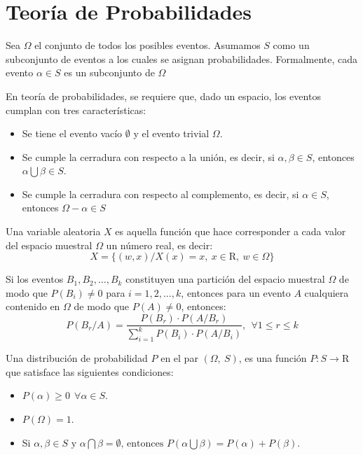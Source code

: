\section{Teoría de Probabilidades}
  \begin{defn} Sea $\Omega$ el conjunto de todos los 
  posibles eventos. Asumamos $S$ como un subconjunto de eventos a los cuales 
  se asignan probabilidades. Formalmente, cada evento $\alpha \in S$ es un 
  subconjunto de $\Omega$
  \end{defn}
 En teoría de probabilidades, se requiere que, dado un espacio, los eventos 
 cumplan con tres características:
  \begin{itemize}
    \item Se tiene el evento vacío $\emptyset$ y el evento trivial $\Omega$.
    \item Se cumple la cerradura con respecto a la unión, es decir, si 
    $\alpha, \beta \in S$, entonces $\alpha \bigcup \beta \in S$.
    \item Se cumple la cerradura con respecto al complemento, es decir, si 
    $\alpha \in S$, entonces $\Omega - \alpha \in S$
  \end{itemize}
  \begin{defn} Una variable aleatoria $X$ es aquella 
  función que hace corresponder a cada valor del espacio muestral $\Omega$ un 
  número real, es decir: 
  $$X = \lbrace (w, x) / X(x) = x, ~x \in \mathrm{R}, ~w \in \Omega \rbrace$$
	\end{defn}
  \begin{thm} Si los eventos $B_1, B_2, \dots, B_k$ 
  constituyen una partición del espacio muestral $\Omega$ de modo que 
  $P(B_i) \neq 0$ para $i = 1,2,\dots,k$, entonces para un evento $A$ 
  cualquiera contenido en $\Omega$ de modo que $P(A) \neq 0$, entonces: 
  $$P(B_r / A) = \dfrac{P(B_r) \cdot P(A / B_r)}{\displaystyle\sum_{i=1}^{k}{P(B_i) \cdot P(A / B_i)}}, ~~ \forall 1\leq r \leq k$$
  \label{thm:cap-marcoteorico:teorema-bayes}
	\end{thm}
  \begin{defn} Una distribución de probabilidad 
  $P$ en el par $(\Omega,~ S)$, es una función $P : S \rightarrow \mathrm{R}$
  que satisface las siguientes condiciones:
	  \begin{itemize}
	    \item $P(\alpha) \geq 0 ~~ \forall \alpha \in S$.
	    \item $P(\Omega) = 1$.
	    \item Si $\alpha, \beta \in S \text{ y } \alpha \bigcap \beta = \emptyset \text{, entonces } P(\alpha \bigcup \beta) = P(\alpha) + P(\beta)$.
	  \end{itemize}
  \end{defn}
